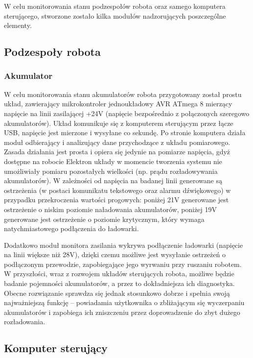 W celu monitorowania stanu podzespołów robota oraz samego komputera sterującego,
stworzone zostało kilka modułów nadzorujących poszczególne elementy.

\subsection{Podzespoły robota}

\subsubsection{Akumulator}

W celu monitorowania stanu akumulatorów robota przygotowany został prostu układ,
zawierający mikrokontroler jednoukładowy AVR ATmega 8 mierzący napięcie na linii
zasilającej +24V (napięcie bezpośrednio z połączonych szeregowo akumulatorów).
Układ komunikuje się z komputerem sterującym przez łącze USB, napięcie jest
mierzone i wysyłane co sekundę. Po stronie komputera działa moduł odbierający i
analizujący dane przychodzące z układu pomiarowego. Zasada działania jest prosta
i opiera się jedynie na pomiarze napięcia, gdyż dostępne na robocie Elektron
układy w momencie tworzenia systemu nie umożliwiały pomiaru pozostałych
wielkości (np. prądu rozładowywania akumulatorów). W zależności od napięcia na
badanej linii generowane są ostrzeżenia (w postaci komunikatu tekstowego oraz
alarmu dźwiękowego) w przypadku przekroczenia wartości progowych: poniżej 21V
generowane jest ostrzeżenie o niskim poziomie naładowania akumulatorów, poniżej
19V generowane jest ostrzeżenie o poziomie krytycznym, który wymaga
natychmiastowego podłączenia do ładowarki.

Dodatkowo moduł monitora zasilania wykrywa podłączenie ładowarki (napięcie na
linii większe niż 28V), dzięki czemu możliwe jest wysyłanie ostrzeżeń o
podłączonym przewodzie, zapobiegające jego wyrwaniu przy ruszaniu robotem. W
przyszłości, wraz z rozwojem układów sterujących robota, możliwe będzie badanie
pojemności akumulatorów, a przez to dokładniejsza ich diagnostyka. Obecne 
rozwiązanie sprawdza się jednak stosunkowo dobrze i spełnia swoją najważniejszą
funkcję -- powiadamia użytkownika o zbliżającym się wyczerpaniu akumulatorów i
zapobiega ich zniszczeniu przez doprowadzenie do zbyt dużego rozładowania.

\subsection{Komputer sterujący}

